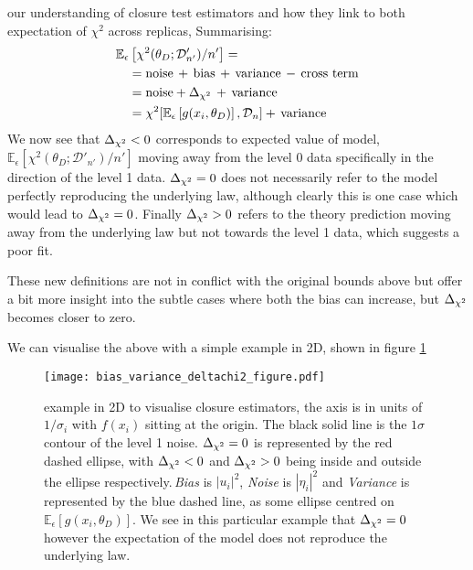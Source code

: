 our understanding of closure test estimators and how they link to both
expectation of $\chi^2$ across replicas, Summarising:
%
\begin{align}
    &\mathbb{E}_{\epsilon}\left[\chi^2(\theta_D; \mathcal{D}'_{n'})/n'\right] = \nonumber \\
    & \quad = \mathrm{noise} \, + \, \mathrm{bias} \, + \, \mathrm{variance} \, - \, \mathrm{cross \ term} \\
    & \quad = \mathrm{noise} + \Delta_{\chi^{2}} \, + \, \mathrm{variance} \\
    & \quad = \chi^2[\mathbb{E}_{\epsilon}\left[g(x_i,\theta_D)\right], \mathcal{D}_n] + \, \mathrm{variance}
\end{align}
%
We now see that $\Delta_{\chi^{2}} < 0$
corresponds to expected value of model,
$\mathbb{E}_{\epsilon}\left[\chi^2(\theta_D; \mathcal{D}'_{n'})/n'\right]$
moving away from the level 0 data specifically in the direction of the level 1
data. $\Delta_{\chi^{2}} = 0$ does not necessarily refer to the model perfectly reproducing the underlying law,
although clearly this is one case which would lead to $\Delta_{\chi^{2}}=0$.
Finally $\Delta_{\chi^{2}} > 0$ refers to the theory prediction moving
away from the underlying law but not towards the level 1 data, which suggests a
poor fit.

These new definitions are not in conflict with the original bounds above but
offer a bit more insight into the subtle cases where both the bias can increase,
but $\Delta_{\chi^{2}}$ becomes closer to zero.

We can visualise the above with a simple example in 2D, shown in figure
\ref{fig:vectorexample}
\newpage
%
\begin{figure}[!h]
    \centering
    \texttt{[image: bias\_variance\_deltachi2\_figure.pdf]}
    \caption{example in 2D to visualise closure estimators, the axis
    is in units of $1/\sigma_{i}$ with $f(x_i)$ sitting at the origin.
    The black solid line is the $1 \sigma$ contour of the level 1 noise.
    $\Delta_{\chi^{2}}=0$ is represented by the red dashed
    ellipse, with $\Delta_{\chi^{2}} < 0$ and $\Delta_{\chi^{2}} > 0$ being inside and outside the ellipse
    respectively.\,{\em Bias} is $|u_i|^2$, {\em Noise} is $|\eta_i|^2$ and {\em Variance} is
    represented by the blue dashed line, as some ellipse centred on
    $\mathbb{E}_{\epsilon}\left[ g(x_i, \theta_D)\right]$. We see in this
    particular example that $\Delta_{\chi^{2}}=0$ however the expectation of the model does
    not reproduce the underlying law.}
    \label{fig:vectorexample}
\end{figure}
%

